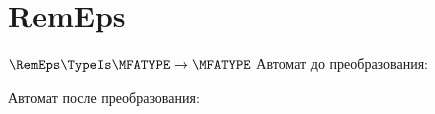 \section{RemEps}
\begin{frame}{$\RemEps\TypeIs\MFATYPE\to\MFATYPE$}
	Автомат до преобразования:

	Автомат после преобразования:

\end{frame}
